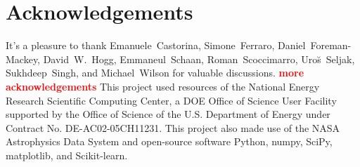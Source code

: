 \documentclass[12pt, letterpaper, preprint]{aastex}
\newcommand{\todo}[1]{{\bf \textcolor{red}{#1}}}
\begin{document}
\section*{Acknowledgements}
It's a pleasure to thank 
    Emanuele~Castorina,
    Simone~Ferraro,
    Daniel~Foreman-Mackey, 
    David~W.~Hogg,
    Emmaneul~Schaan, 
    Roman~Scoccimarro,
    Uro{\u s}~Seljak,
    Sukhdeep~Singh, 
    and Michael~Wilson
for valuable discussions.
\todo{more acknowledgements}
This project used resources of the National Energy Research 
Scientific Computing Center, a DOE Office of Science User 
Facility supported by the Office of Science of the U.S. 
Department of Energy under Contract No. DE-AC02-05CH11231.
This project also made use of the NASA Astrophysics Data 
System and open-source software Python, numpy, SciPy, matplotlib, 
and Scikit-learn.



\end{document}
